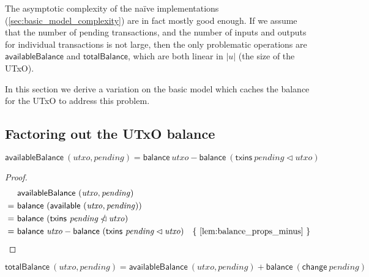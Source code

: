 \documentclass{article}
\newcommand{\restrictdom}{\lhd}
\newcommand{\subtractdom}{\mathbin{\slashed{\restrictdom}}}
\theoremstyle{definition}{
  \newtheorem{lemma}{Lemma}[section] %
  \newtheorem{definition}[lemma]{Definition}
}
\theoremstyle{theorem}{
  \newtheorem{invariant}[lemma]{Invariant}
  \newtheorem{proofobligation}[lemma]{Proof Obligation}
}
\numberwithin{equation}{lemma}
\begin{document}
The asymptotic complexity of the na\"ive implementations
(\cref{sec:basic_model_complexity}) are in fact mostly good enough. If we
assume that the number of pending transactions, and the number of inputs and
outputs for individual transactions is not large, then the only problematic
operations are $\mathsf{availableBalance}$ and $\mathsf{totalBalance}$, which
are both linear in $|u|$ (the size of the UTxO).

In this section we derive a variation on the basic model which caches the
balance for the UTxO to address this problem.


\subsection{Factoring out the UTxO balance}

\begin{lemma}
\begin{equation*}
  \mathsf{availableBalance} ~ (\mathit{utxo}, \mathit{pending})
= \mathsf{balance} ~ \mathit{utxo} - \mathsf{balance} ~ (\mathsf{txins} ~ \mathit{pending} \restrictdom \mathit{utxo})
\end{equation*}
\label{lem:availableBalance}
\end{lemma}

\begin{proof}
\begin{align*}
  & ~ \mathsf{availableBalance} ~ (\mathit{utxo}, \mathit{pending}) \\
= & ~ \mathsf{balance} ~ (\mathsf{available} ~ (\mathit{utxo}, \mathit{pending})) \\
= & ~ \mathsf{balance} ~ (\mathsf{txins} ~ \mathit{pending} \subtractdom \mathit{utxo}) \\
= & ~ \mathsf{balance} ~ \mathit{utxo} - \mathsf{balance} ~ (\mathsf{txins} ~ \mathit{pending} \restrictdom \mathit{utxo})
  & \text{\{ \cref{lem:balance_props_minus} \}}
\end{align*}
\end{proof}

\begin{lemma}
\begin{equation*}
  \mathsf{totalBalance} ~ (\mathit{utxo}, \mathit{pending})
= \mathsf{availableBalance} ~ (\mathit{utxo}, \mathit{pending})
+ \mathsf{balance} ~ (\mathsf{change} ~ \mathit{pending})
\end{equation*}
\label{lem:totalBalance}
\end{lemma}
\end{document}
